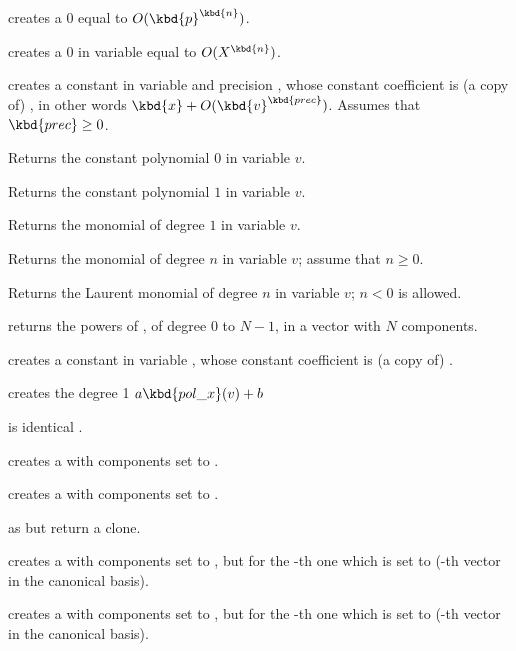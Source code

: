  creates a $0$  equal to
$O(\kbd{p}^\kbd{n})$.

 creates a $0$  in variable
 equal to $O(X^\kbd{n})$.

 creates a constant 
in variable  and precision , whose constant coefficient is
(a copy of) , in other words $\kbd{x} + O(\kbd{v}^\kbd{prec})$.
Assumes that $\kbd{prec}\geq 0$.

 Returns the constant polynomial $0$ in variable $v$.

 Returns the constant polynomial $1$ in variable $v$.

 Returns the monomial of degree $1$ in variable $v$.

 Returns the monomial of degree $n$
in variable $v$; assume that $n \geq 0$.

 Returns the Laurent monomial of degree $n$
in variable $v$; $n < 0$ is allowed.

 returns the powers of
, of degree $0$ to $N-1$, in a vector with $N$ components.

 creates a constant  in variable
, whose constant coefficient is (a copy of) .

 creates the degree 1 
$a \kbd{pol\_x}(v) + b$

 is identical .

 creates a  with  components set to
.

 creates a  with  components set to
.

 as  but return a clone.

 creates a  with  components
set to , but for the -th one which is set to 
(-th vector in the canonical basis).

 creates a  with  components
set to , but for the -th one which is set to 
(-th vector in the canonical basis).

